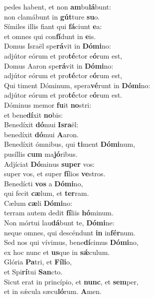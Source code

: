 {\vin  pedes habent, et non \textbf{am}bu\textbf{lá}bunt:~\*\\
\vin non clamábunt in \textbf{gút}ture \textbf{su}o.\\
Símiles illis fiant qui \textbf{fá}ciunt \textbf{e}a:~\*\\
et omnes qui con\textbf{fí}dunt in \textbf{e}is.\\
\vin Domus Israël spe\textbf{rá}vit in \textbf{Dó}\textbf{mi}no:~\*\\
\vin adjútor eórum et pro\textbf{té}ctor e\textbf{ó}rum est,\\
Domus Aaron spe\textbf{rá}vit in \textbf{Dó}\textbf{mi}no:~\*\\
adjútor eórum et pro\textbf{té}ctor e\textbf{ó}rum est,\\
\vin Qui timent Dóminum, spera\textbf{vé}runt in \textbf{Dó}\textbf{mi}no:~\*\\
\vin adjútor eórum et pro\textbf{té}ctor e\textbf{ó}rum est.\\
Dóminus memor \textbf{fu}it \textbf{no}stri:~\*\\
et bene\textbf{dí}xit \textbf{no}bis:\\
\vin Benedíxit \textbf{dó}mui \textbf{Is}\textbf{ra}ël:~\*\\
\vin benedíxit \textbf{dó}mui \textbf{A}aron.\\
Benedíxit ómnibus, qui \textbf{ti}ment \textbf{Dó}\textbf{mi}num,~\*\\
pusíllis \textbf{cum} ma\textbf{jó}ribus.\\
\vin Adjíciat \textbf{Dó}minus \textbf{su}\textbf{per} vos:~\*\\
\vin super vos, et super \textbf{fí}lios \textbf{ve}stros.\\
Benedícti \textbf{vos} a \textbf{Dó}\textbf{mi}no,~\*\\
qui fecit \textbf{cæ}lum, et \textbf{ter}ram.\\
\vin Cælum \textbf{cæ}li \textbf{Dó}\textbf{mi}no:~\*\\
\vin terram autem dedit \textbf{fí}liis \textbf{hó}minum.\\
Non mórtui lau\textbf{dá}bunt te, \textbf{Dó}\textbf{mi}ne:~\*\\
neque omnes, qui descéndunt \textbf{in} in\textbf{fér}num.\\
\vin Sed nos qui vívimus, bene\textbf{dí}cimus \textbf{Dó}\textbf{mi}no,~\*\\
\vin ex hoc nunc et \textbf{us}que in \textbf{sǽ}culum.\\
Glória \textbf{Pa}tri, et \textbf{Fí}\textbf{li}o,~\*\\
et Spi\textbf{rí}tui \textbf{San}cto.\\
\vin Sicut erat in princípio, et \textbf{nunc}, et \textbf{sem}per,~\*\\
\vin et in sǽcula sæcu\textbf{ló}rum. \textbf{A}men.\\
}

